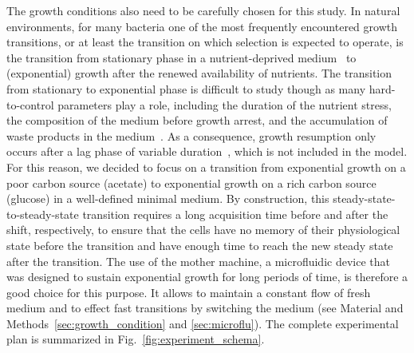 The growth conditions also need to be carefully chosen for this study.
In natural environments, for many bacteria one of the most frequently encountered growth transitions, or at least the transition on which selection is expected to operate, is the transition from stationary phase in a nutrient-deprived medium~\cite{gefen_direct_2014} to (exponential) growth after the renewed availability of nutrients.
The transition from stationary to exponential phase is difficult to study though as many hard-to-control parameters play a role, including the duration of the nutrient stress, the composition of the medium before growth arrest, and the accumulation of waste products in the medium~\cite{ehrenberg_mediumdependent_2012}.
As a consequence, growth resumption only occurs after a lag phase of variable duration~\cite{ng_damage_1962,dufrenne_effect_1997,shaw_effect_1967,mcmeekin_predictive_2002,cheroutre-vialette_application_2002}, which is not included in the model.
For this reason, we decided to focus on a transition from exponential growth on a poor carbon source (acetate) to exponential growth on a rich carbon source (glucose) in a well-defined minimal medium.
By construction, this steady-state-to-steady-state transition requires a long acquisition time before and after the shift, respectively, to ensure that the cells have no memory of their physiological state before the transition and have enough time to reach the new steady state after the transition.
The use of the mother machine, a microfluidic device that was designed to sustain exponential growth for long periods of time, is therefore a good choice for this purpose.
It allows to maintain a constant flow of fresh medium and to effect fast transitions by switching the medium (see Material and Methods~\ref{sec:growth_condition} and \ref{sec:microflu}).
The complete experimental plan is summarized in Fig.~\ref{fig:experiment_schema}.

